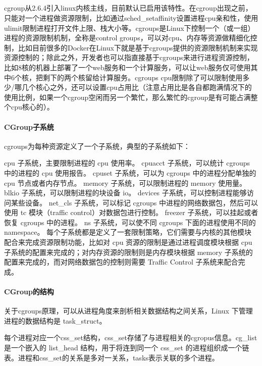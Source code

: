 \documentclass[../../../interview-questions.tex]{subfiles}
\begin{document}
\subsection{\color{red}{容器三把斧之cgroup原理与实现}}

cgroup从2.6.4引入linux内核主线，目前默认已启用该特性。在cgroup出现之前，只能对一个进程做资源限制，比如通过sched\_setaffinity设置进程cpu亲和性，使用ulimit限制进程打开文件上限、栈大小等。cgroups是Linux下控制一个（或一组）进程的资源限制机制，全称是control groups，可以对cpu、内存等资源做精细化控制，比如目前很多的Docker在Linux下就是基于cgroups提供的资源限制机制来实现资源控制的；除此之外，开发者也可以指直接基于cgroups来进行进程资源控制，比如8核的机器上部署了一个web服务和一个计算服务，可以让web服务仅可使用其中6个核，把剩下的两个核留给计算服务。cgroups cpu限制除了可以限制使用多少/哪几个核心之外，还可以设置cpu占用比（注意占用比是各自都跑满情况下的使用比例，如果一个cgroup空闲而另一个繁忙，那么繁忙的cgroup是有可能占满整个cpu核心的）。

\paragraph{CGroup子系统}

cgroups为每种资源定义了一个子系统，典型的子系统如下：

cpu 子系统，主要限制进程的 cpu 使用率。
cpuacct 子系统，可以统计 cgroups 中的进程的 cpu 使用报告。
cpuset 子系统，可以为 cgroups 中的进程分配单独的 cpu 节点或者内存节点。
memory 子系统，可以限制进程的 memory 使用量。
blkio 子系统，可以限制进程的块设备 io。
devices 子系统，可以控制进程能够访问某些设备。
net\_cls 子系统，可以标记 cgroups 中进程的网络数据包，然后可以使用 tc 模块（traffic control）对数据包进行控制。
freezer 子系统，可以挂起或者恢复 cgroups 中的进程。
ns 子系统，可以使不同 cgroups 下面的进程使用不同的 namespace。
每个子系统都是定义了一套限制策略，它们需要与内核的其他模块配合来完成资源限制功能，比如对 cpu 资源的限制是通过进程调度模块根据 cpu 子系统的配置来完成的；对内存资源的限制则是内存模块根据 memory 子系统的配置来完成的，而对网络数据包的控制则需要 Traffic Control 子系统来配合完成。

\paragraph{CGroup的结构}

关于cgroups原理，可以从进程角度来剖析相关数据结构之间关系，Linux 下管理进程的数据结构是 task\_struct。

每个进程对应一个css\_set结构，css\_set存储了与进程相关的cgropus信息。cg\_list是一个嵌入的 list\_head 结构，用于将连到同一个 css\_set 的进程组织成一个链表。进程和css\_set的关系是多对一关系，tasks表示关联的多个进程。
\end{document}

